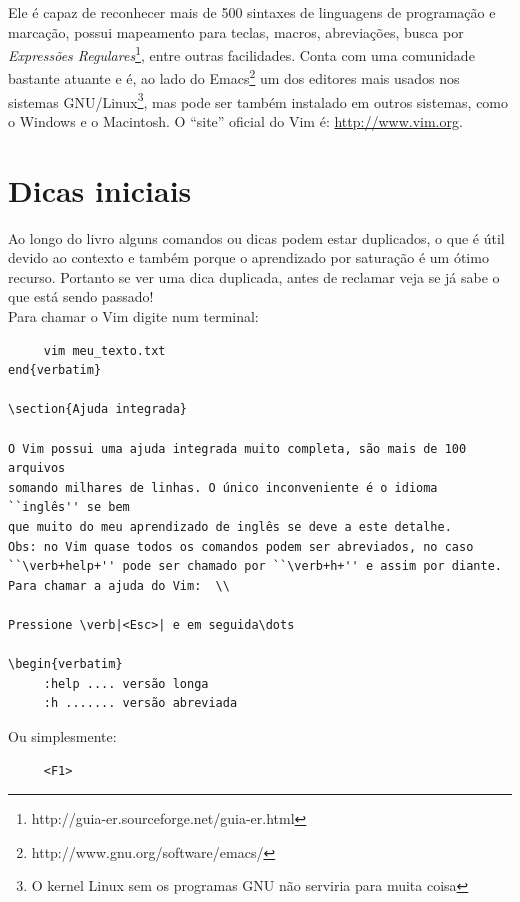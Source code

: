 \documentclass[10pt,a4paper,openany]{book}
\begin{document}
Ele é capaz de reconhecer mais de 500 sintaxes de linguagens de programação e
marcação, possui mapeamento para teclas, macros, abreviações, busca por
{\em{Expressões Regulares}}\footnote{http://guia-er.sourceforge.net/guia-er.html},
entre outras facilidades. Conta com uma comunidade bastante atuante e é, ao
lado do Emacs\footnote{http://www.gnu.org/software/emacs/} um dos editores mais
usados nos sistemas GNU/Linux\footnote{O kernel Linux sem os programas GNU não serviria para muita coisa},
mas pode ser também instalado em outros sistemas,
como o Windows e o Macintosh.  O ``site'' oficial do Vim é:
\url{http://www.vim.org}.


\section{Dicas iniciais}\label{Dicas iniciais}

Ao longo do livro alguns comandos ou dicas podem estar duplicados, o que
é útil devido ao contexto e também porque o aprendizado por saturação
é um ótimo recurso. Portanto se ver uma dica duplicada, antes de
reclamar veja se já sabe o que está sendo passado! \\

Para chamar o Vim digite num terminal:

\begin{verbatim}
     vim meu_texto.txt
end{verbatim}

\section{Ajuda integrada}

O Vim possui uma ajuda integrada muito completa, são mais de 100 arquivos
somando milhares de linhas. O único inconveniente é o idioma ``inglês'' se bem
que muito do meu aprendizado de inglês se deve a este detalhe.
Obs: no Vim quase todos os comandos podem ser abreviados, no caso
``\verb+help+'' pode ser chamado por ``\verb+h+'' e assim por diante.
Para chamar a ajuda do Vim:  \\

Pressione \verb|<Esc>| e em seguida\dots

\begin{verbatim}
     :help .... versão longa
     :h ....... versão abreviada
\end{verbatim}

Ou simplesmente:

\begin{verbatim}
     <F1>
\end{verbatim}
\end{document}
